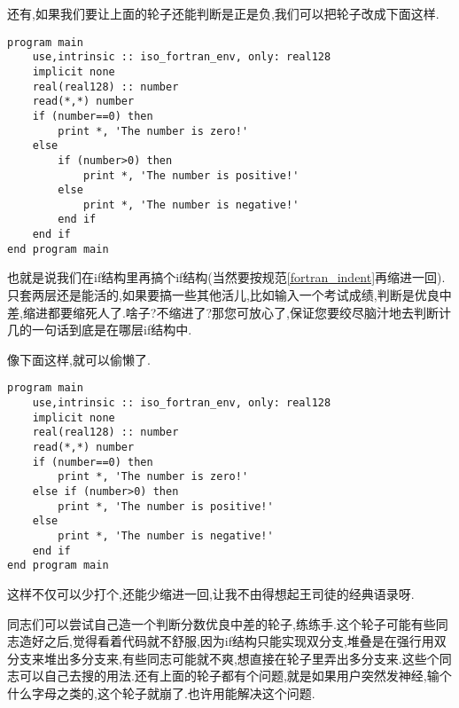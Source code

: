 还有,如果我们要让上面的轮子还能判断是正是负,我们可以把轮子改成下面这样.
\begin{lstlisting}
program main
    use,intrinsic :: iso_fortran_env, only: real128
    implicit none
    real(real128) :: number
    read(*,*) number
    if (number==0) then
        print *, 'The number is zero!'
    else
        if (number>0) then
            print *, 'The number is positive!'
        else
            print *, 'The number is negative!'
        end if
    end if
end program main
\end{lstlisting}
也就是说我们在if结构里再搞个if结构(当然要按规范\ref{fortran_indent}再缩进一回).只套两层还是能活的,如果要搞一些其他活儿,比如输入一个考试成绩,判断是优良中差,缩进都要缩死人了.啥子?不缩进了?那您可放心了,保证您要绞尽脑汁地去判断计几的一句话到底是在哪层if结构中.

像下面这样,就可以偷懒了.
\begin{lstlisting}
program main
    use,intrinsic :: iso_fortran_env, only: real128
    implicit none
    real(real128) :: number
    read(*,*) number
    if (number==0) then
        print *, 'The number is zero!'
    else if (number>0) then
        print *, 'The number is positive!'
    else
        print *, 'The number is negative!'
    end if
end program main
\end{lstlisting}
这样不仅可以少打个,还能少缩进一回,让我不由得想起王司徒的经典语录呀.

同志们可以尝试自己造一个判断分数优良中差的轮子,练练手.这个轮子可能有些同志造好之后,觉得看着代码就不舒服,因为if结构只能实现双分支,堆叠是在强行用双分支来堆出多分支来,有些同志可能就不爽,想直接在轮子里弄出多分支来.这些个同志可以自己去搜的用法.还有上面的轮子都有个问题,就是如果用户突然发神经,输个什么字母之类的,这个轮子就崩了.也许用能解决这个问题.

